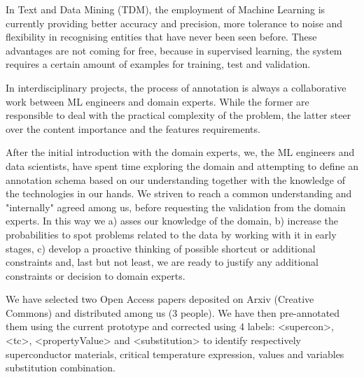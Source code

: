 \documentclass[a4paper,10pt]{article}
\begin{document}
In Text and Data Mining (TDM), the employment of Machine Learning is currently providing better accuracy and precision, more tolerance to noise and flexibility in recognising entities that have never been seen before. These advantages are not coming for free, because in supervised learning, the system requires a certain amount of examples for training, test and validation. 


In interdisciplinary projects, the process of annotation is always a collaborative work between ML engineers and domain experts. While the former are responsible to deal with the practical complexity of the problem, the latter steer over the content importance and the features requirements. 

After the initial introduction with the domain experts, we, the ML engineers and data scientists, have spent time exploring the domain and attempting to define an annotation schema based on our understanding together with the knowledge of the technologies in our hands. We striven to reach a common understanding and "internally" agreed among us, before requesting the validation from the domain experts. 
In this way we a) asses our knowledge of the domain, b) increase the probabilities to spot problems related to the data by working with it in early stages, c) develop a proactive thinking of possible shortcut or additional constraints and, last but not least, we are ready to justify any additional constraints or decision to domain experts. 

We have selected two Open Access papers deposited on Arxiv (Creative Commons) and distributed among us (3 people). We have then pre-annotated them using the current prototype and corrected using 4 labels: <supercon>, <tc>, <propertyValue> and <substitution> to identify respectively superconductor materials, critical temperature expression, values and variables substitution combination. 
\end{document}
